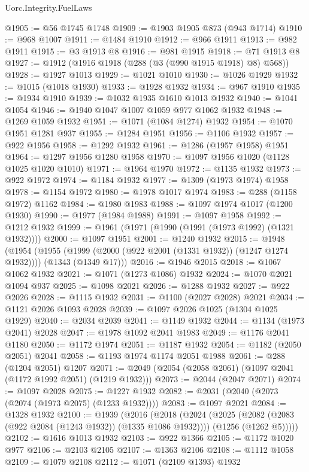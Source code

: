 \begin{lexlean}{Uorc.Integrity.FuelLaws}
\begin{coremodule}
@1905 := @56 @1745 @1748
@1909 := @1903 @1905 @873 (@943 @1714)
@1910 := @968 @1007
@1911 := @1484 @1910
@1912 := @966 @1911
@1913 := @982 @1911
@1915 := @3 @1913 @8
@1916 := @981 @1915
@1918 := @71 @1913 @8
@1927 := @1912 (@1916 @1918 (@288 (@3 (@990 @1915 @1918) @8) @568))
@1928 := @1927 @1013
@1929 := @1021 @1010
@1930 := @1026 @1929
@1932 := @1015 (@1018 @1930)
@1933 := @1928 @1932
@1934 := @967 @1910
@1935 := @1934 @1910
@1939 := @1032 @1935 @1610 @1013 @1932
@1940 := @1041 @1054
@1946 := @1940 @1047 @1007 @1059 @977 @1062 @1932
@1948 := @1269 @1059 @1932
@1951 := @1071 (@1084 @1274) @1932
@1954 := @1070 @1951 @1281 @937
@1955 := @1284 @1951
@1956 := @1106 @1932
@1957 := @922 @1956
@1958 := @1292 @1932
@1961 := @1286 (@1957 @1958) @1951
@1964 := @1297 @1956 @1280 @1958
@1970 := @1097 @1956 @1020 (@1128 @1025 @1020 @1010)
@1971 := @1964 @1970
@1972 := @1135 @1932
@1973 := @922 @1972
@1974 := @1184 @1932
@1977 := @1309 (@1973 @1974) @1958
@1978 := @1154 @1972
@1980 := @1978 @1017 @1974
@1983 := @288 (@1158 @1972) @1162
@1984 := @1980 @1983
@1988 := @1097 @1974 @1017 (@1200 @1930)
@1990 := @1977 (@1984 @1988)
@1991 := @1097 @1958
@1992 := @1212 @1932
@1999 := @1961 (@1971 (@1990 (@1991 (@1973 @1992) (@1321 @1932))))
@2000 := @1097 @1951
@2001 := @1240 @1932
@2015 := @1948
    (@1954
      (@1955 (@1999 (@2000 (@922 @2001 (@1331 @1932)) (@1247 @1274 @1932))))
      (@1343 (@1349 @17)))
@2016 := @1946 @2015
@2018 := @1067 @1062 @1932
@2021 := @1071 (@1273 @1086) @1932
@2024 := @1070 @2021 @1094 @937
@2025 := @1098 @2021
@2026 := @1288 @1932
@2027 := @922 @2026
@2028 := @1115 @1932
@2031 := @1100 (@2027 @2028) @2021
@2034 := @1121 @2026 @1093 @2028
@2039 := @1097 @2026 @1025 (@1304 @1025 @1929)
@2040 := @2034 @2039
@2041 := @1149 @1932
@2044 := @1134 (@1973 @2041) @2028
@2047 := @1978 @1092 @2041 @1983
@2049 := @1176 @2041 @1180
@2050 := @1172 @1974
@2051 := @1187 @1932
@2054 := @1182 (@2050 @2051) @2041
@2058 := @1193 @1974 @1174 @2051 @1988
@2061 := @288 (@1204 @2051) @1207
@2071 := @2049 (@2054 (@2058 @2061) (@1097 @2041 (@1172 @1992 @2051) (@1219 @1932)))
@2073 := @2044 (@2047 @2071)
@2074 := @1097 @2028
@2075 := @1227 @1932
@2082 := @2031 (@2040 (@2073 (@2074 (@1973 @2075) (@1233 @1932))))
@2083 := @1097 @2021
@2084 := @1328 @1932
@2100 := @1939
    (@2016
      (@2018
        (@2024
          (@2025 (@2082 (@2083 (@922 @2084 (@1243 @1932)) (@1335 @1086 @1932))))
          (@1256 (@1262 @5)))))
@2102 := @1616 @1013 @1932
@2103 := @922 @1366
@2105 := @1172 @1020 @977
@2106 := @2103 @2105
@2107 := @1363 @2106
@2108 := @1112 @1058
@2109 := @1079 @2108
@2112 := @1071 (@2109 @1393) @1932

\end{coremodule}
\end{lexlean}
